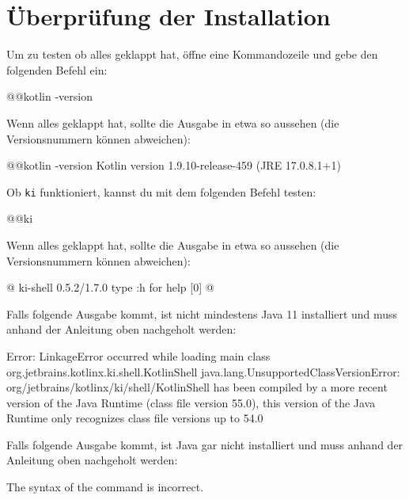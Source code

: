 \section*{Überprüfung der Installation}\label{sec:check}
Um zu testen ob alles geklappt hat, öffne eine Kommandozeile und gebe den folgenden Befehl ein:
\begin{commandshell}
    @\shellprefix{}@kotlin -version
\end{commandshell}

Wenn alles geklappt hat, sollte die Ausgabe in etwa so aussehen (die Versionsnummern können abweichen):
\begin{commandshell}[][]
    @\shellprefix{}@kotlin -version
    Kotlin version 1.9.10-release-459 (JRE 17.0.8.1+1)
\end{commandshell}

Ob \texttt{ki} funktioniert, kannst du mit dem folgenden Befehl testen:
\begin{commandshell}
    @\shellprefix{}@ki
\end{commandshell}
Wenn alles geklappt hat, sollte die Ausgabe in etwa so aussehen (die Versionsnummern können abweichen):
\begin{commandshell}[][minted language=text]
    @\shellprefix@ki
    ki-shell 0.5.2/1.7.0
    type :h for help
    [0] @\shellcursor@
\end{commandshell}
Falls folgende Ausgabe kommt, ist nicht mindestens Java 11 installiert und muss anhand der Anleitung oben nachgeholt werden:
\nopagebreak
\begin{commandshell}[][minted language=text]
    Error: LinkageError occurred while loading main class org.jetbrains.kotlinx.ki.shell.KotlinShell
    java.lang.UnsupportedClassVersionError: org/jetbrains/kotlinx/ki/shell/KotlinShell has been compiled by a more recent version of the Java Runtime (class file version 55.0), this version of the Java Runtime only recognizes class file versions up to 54.0
\end{commandshell}
Falls folgende Ausgabe kommt, ist Java gar nicht installiert und muss anhand der Anleitung oben nachgeholt werden:
\nopagebreak
\begin{commandshell}[][minted language=text]
    The syntax of the command is incorrect.
\end{commandshell}


